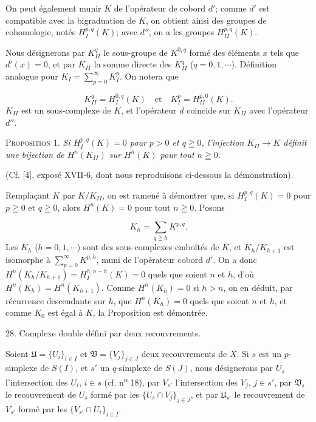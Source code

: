 On peut également munir $K$ de l'opérateur de cobord $d'$; comme $d'$ est compatible avec la bigraduation de $K$, on obtient ainsi des groupes de cohomologie, notés $H_I^{p,q}(K)$; avec $d''$, on a les groupes $H_{II}^{p,q}(K)$.

Nous désignerons par $K_{II}^q$ le sous-groupe de $K^{0,q}$ formé des éléments $x$ tels que $d'(x) = 0$, et par $K_{II}$ la somme directe des $K_{II}^q$ ($q = 0, 1, \cdots$). Définition analogue pour $K_I = \sum_{p=0}^{\infty} K_I^p$. On notera que

\begin{equation*}
K_{II}^q = H_I^{0,q}(K) \quad \text{et} \quad K_I^p = H_{II}^{p,0}(K).
\end{equation*}
$K_{II}$ est un sous-complexe de $K$, et l'opérateur $d$ coincide sur $K_{II}$ avec l'opérateur $d''$.



\textsc{Proposition} 1. \textit{Si $H_I^{p,q}(K) = 0$ pour $p > 0$ et $q \geqq 0$, l'injection $K_{II} \to K$ définit une bijection de $H^n(K_{II})$ sur $H^n(K)$ pour tout $n \geqq 0$.}

(Cf. [4], exposé XVII-6, dont nous reproduisons ci-dessous la démonstration).

Remplaçant $K$ par $K/K_{II}$, on est ramené à démontrer que, si $H_I^{p,q}(K) = 0$ pour $p \geqq 0$ et $q \geqq 0$, alors $H^n(K) = 0$ pour tout $n \geqq 0$. Posons

\begin{equation*}
K_h = \sum_{q \geqq h} K^{p,q}.
\end{equation*}
Les $K_h$ ($h = 0, 1, \cdots$) sont des sous-complexes emboîtés de $K$, et $K_h/K_{h+1}$ est isomorphe à $\sum_{p=0}^{\infty} K^{p,h}$, muni de l'opérateur cobord $d'$. On a donc $H^n(K_h/K_{h+1}) = H_I^{h,n-h}(K) = 0$ quels que soient $n$ et $h$, d'où $H^n(K_h) = H^n(K_{h+1})$. Comme $H^n(K_h) = 0$ si $h > n$, on en déduit, par récurrence descendante sur $h$, que $H^n(K_h) = 0$ quels que soient $n$ et $h$, et comme $K_0$ est égal à $K$, la Proposition est démontrée.


28. Complexe double défini par deux recouvrements.

Soient $\mathfrak{U} = \{U_i\}_{i \in I}$ et $\mathfrak{V} = \{V_j\}_{j \in J}$ deux recouvrements de $X$. Si $s$ est un $p$-simplexe de $S(I)$, et $s'$ un $q$-simplexe de $S(J)$, nous désignerons par $U_s$ l'intersection des $U_i$, $i \in s$ (cf. n\textsuperscript{o} 18), par $V_{s'}$ l'intersection des $V_j$, $j \in s'$, par $\mathfrak{V}_s$ le recouvrement de $U_s$ formé par les $\{U_s \cap V_j\}_{j \in J}$, et par $\mathfrak{U}_{s'}$ le recouvrement de $V_{s'}$ formé par les $\{V_{s'} \cap U_i\}_{i \in I}$.

